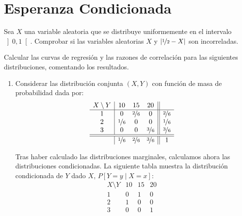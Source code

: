\section{Esperanza Condicionada}

\begin{ejercicio}
    Sea $X$ una variable aleatoria que se distribuye uniformemente en el intervalo $\left]0,1\right[$. Comprobar si las variables aleatorias $X$ y $|\nicefrac{1}{2}-X|$ son incorreladas.
\end{ejercicio}

\begin{ejercicio}
    Calcular las curvas de regresión y las razones de correlación para las siguientes distribuciones, comentando los resultados.
    \begin{enumerate}
        \item Considerar las distribución conjunta $(X,Y)$ con función de masa de probabilidad dada por:
        \begin{equation*}
            \begin{array}{c|ccc||c}
                X\setminus Y & 10 & 15 & 20 & \\
                \hline
                1 & 0 & \nicefrac{2}{6} & 0 & \nicefrac{2}{6}\\
                2 & \nicefrac{1}{6} & 0 & 0 & \nicefrac{1}{6}\\
                3 & 0 & 0 & \nicefrac{3}{6} & \nicefrac{3}{6}\\
                \hline \hline
                & \nicefrac{1}{6} & \nicefrac{2}{6} & \nicefrac{3}{6} & 1
            \end{array}
        \end{equation*}

        Tras haber calculado las distribuciones marginales, calculamos ahora las distribuciones condicionadas.
        La siguiente tabla muestra la distribución condicionada de $Y$ dado $X$, $P[Y = y\mid X = x]$:
        \begin{equation*}
            \begin{array}{c|ccc}
                X\setminus Y & 10 & 15 & 20 \\
                \hline
                1 & 0 & 1 & 0\\
                2 & 1 & 0 & 0\\
                3 & 0 & 0 & 1
            \end{array}
        \end{equation*}


\end{enumerate}
\end{ejercicio}
